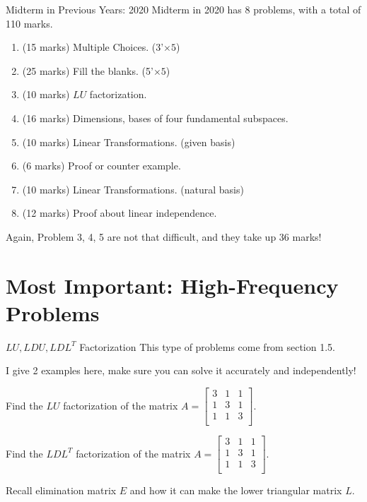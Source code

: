 \documentclass{beamer}
\begin{document}
\begin{frame}{Midterm in Previous Years: 2020}
Midterm in 2020 has 8 problems, with a total of 110 marks.
\begin{enumerate}
    \item (15 marks) Multiple Choices. (3'$\times 5$)
    \item (25 marks) Fill the blanks. (5'$\times 5$)
    \item (10 marks) $LU$ factorization.
    \item (16 marks) Dimensions, bases of four fundamental subspaces.
    \item (10 marks) Linear Transformations. (given basis)
    \item (6 marks) Proof or counter example.
    \item (10 marks) Linear Transformations. (natural basis)
    \item (12 marks) Proof about linear independence.
\end{enumerate}

\vspace{3pt}
Again, Problem 3, 4, 5 are not that difficult, and they take up 36 marks!
\end{frame}

\section{Most Important: High-Frequency Problems}
\begin{frame}{$LU, LDU, LDL^T$ Factorization}
This type of problems come from section 1.5.

\vspace{3pt}
I give 2 examples here, make sure you can solve it accurately and independently!

\vspace{5pt}
Find the $LU$ factorization of the matrix $A=\left[ \begin{matrix}
	3&		1&		1\\
	1&		3&		1\\
	1&		1&		3\\
\end{matrix} \right]$.

\vspace{3pt}
Find the $LDL^T$ factorization of the matrix $A=\left[ \begin{matrix}
	3&		1&		1\\
	1&		3&		1\\
	1&		1&		3\\
\end{matrix} \right]$.

\vspace{5pt}
Recall elimination matrix $E$ and how it can make the lower triangular matrix $L$.
\end{frame}
\end{document}
